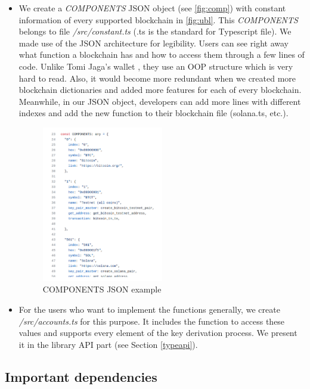 \begin{itemize}
    \item We create a \textit{COMPONENTS} JSON object (see \autoref{fig:comp}) with constant information of every supported blockchain in \autoref{fig:ubl}. This \textit{COMPONENTS} belongs to file \textit{/src/constant.ts} (.ts is the standard for Typescript file). We made use of the JSON architecture for legibility. Users can see right away what function a blockchain has and how to access them through a few lines of code. Unlike  Tomi Jaga's wallet \cite{tomi}, they use an OOP structure which is very hard to read. Also, it would become more redundant when we created more blockchain dictionaries and added more features for each of every blockchain. Meanwhile, in our JSON object, developers can add more lines with different indexes and add the new function to their blockchain file (solana.ts, etc.).
          \begin{figure}[ht!]
              \centering
              \includegraphics[width=0.5\textwidth]{images/components.png}
              \caption[COMPONENTS JSON example]{COMPONENTS JSON example}
              \label{fig:comp}
          \end{figure}
    \item For the users who want to implement the functions generally, we create \textit{/src/accounts.ts} for this purpose. It includes the function to access these values and supports every element of the key derivation process. We present it in the library API part (see Section \ref{typeapi}).
\end{itemize}

\subsection{Important dependencies}

